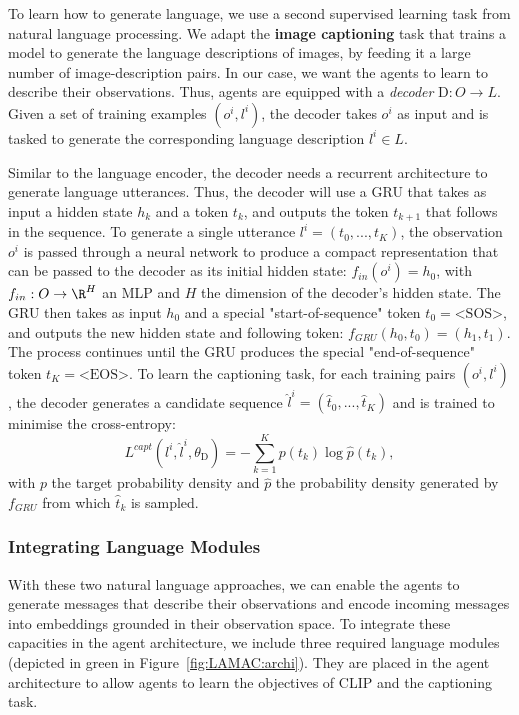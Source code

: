 To learn how to generate language, we use a second supervised learning task from natural language processing. We adapt the \textbf{image captioning} task that trains a model to generate the language descriptions of images, by feeding it a large number of image-description pairs. In our case, we want the agents to learn to describe their observations. Thus, agents are equipped with a \textit{decoder} $\mathrm{D}:O\rightarrow L$. Given a set of training examples $(o^i, l^i)$, the decoder takes $o^i$ as input and is tasked to generate the corresponding language description $l^i\in L$. 

Similar to the language encoder, the decoder needs a recurrent architecture to generate language utterances. Thus, the decoder will use a GRU that takes as input a hidden state $h_k$ and a token $t_k$, and outputs the token $t_{k+1}$ that follows in the sequence. To generate a single utterance $l^i=(t_0,...,t_K)$, the observation $o^i$ is passed through a neural network to produce a compact representation that can be passed to the decoder as its initial hidden state: $f_{in}(o^i)=h_0$, with $f_{in}:O\rightarrow\R^H$ an MLP and $H$ the dimension of the decoder's hidden state. The GRU then takes as input $h_0$ and a special "start-of-sequence" token $t_0=\text{<SOS>}$, and outputs the new hidden state and following token: $f_{GRU}(h_0, t_0)=(h_1, t_1)$. The process continues until the GRU produces the special "end-of-sequence" token $t_K=\text{<EOS>}$. To learn the captioning task, for each training pairs $(o^i, l^i)$, the decoder generates a candidate sequence $\hat{l}^i=(\hat{t}_0,...,\hat{t}_K)$ and is trained to minimise the cross-entropy: 
\begin{equation}
    L^{capt}(l^i,\hat{l}^i,\theta_\mathrm{D})=-\sum_{k=1}^Kp(t_k)\log\hat{p}(t_k),
    \label{eq:LAMAC:Captioning}
\end{equation}
with $p$ the target probability density and $\hat{p}$ the probability density generated by $f_{GRU}$ from which $\hat{t}_k$ is sampled. 


\subsubsection{Integrating Language Modules}

With these two natural language approaches, we can enable the agents to generate messages that describe their observations and encode incoming messages into embeddings grounded in their observation space. 
To integrate these capacities in the agent architecture, we include three required language modules (depicted in green in Figure~\ref{fig:LAMAC:archi}). They are placed in the agent architecture to allow agents to learn the objectives of CLIP and the captioning task. 

